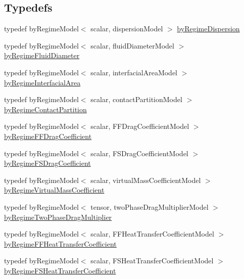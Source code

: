 \subsection*{Typedefs}
\begin{DoxyCompactItemize}
\item 
typedef by\+Regime\+Model$<$ scalar, dispersion\+Model $>$ \hyperlink{namespaceFoam_aca2583acdeaa11914afd02b147b665e0}{by\+Regime\+Dispersion}
\item 
typedef by\+Regime\+Model$<$ scalar, fluid\+Diameter\+Model $>$ \hyperlink{namespaceFoam_a37b69c3166b91333f06a5a6e7edcbcfe}{by\+Regime\+Fluid\+Diameter}
\item 
typedef by\+Regime\+Model$<$ scalar, interfacial\+Area\+Model $>$ \hyperlink{namespaceFoam_afdf68c0599c54515d78f0565678d1545}{by\+Regime\+Interfacial\+Area}
\item 
typedef by\+Regime\+Model$<$ scalar, contact\+Partition\+Model $>$ \hyperlink{namespaceFoam_a41017611e326f39a1a0e4469a6091014}{by\+Regime\+Contact\+Partition}
\item 
typedef by\+Regime\+Model$<$ scalar, F\+F\+Drag\+Coefficient\+Model $>$ \hyperlink{namespaceFoam_af81bf1c46b48683cfa1a97758c9a88ee}{by\+Regime\+F\+F\+Drag\+Coefficient}
\item 
typedef by\+Regime\+Model$<$ scalar, F\+S\+Drag\+Coefficient\+Model $>$ \hyperlink{namespaceFoam_a05904e7dc298f47d7b89ab3e56bcf421}{by\+Regime\+F\+S\+Drag\+Coefficient}
\item 
typedef by\+Regime\+Model$<$ scalar, virtual\+Mass\+Coefficient\+Model $>$ \hyperlink{namespaceFoam_a710fc9b4691ef70d9bc2552dcdd314f9}{by\+Regime\+Virtual\+Mass\+Coefficient}
\item 
typedef by\+Regime\+Model$<$ tensor, two\+Phase\+Drag\+Multiplier\+Model $>$ \hyperlink{namespaceFoam_a85c970e588825086eba5389c52020729}{by\+Regime\+Two\+Phase\+Drag\+Multiplier}
\item 
typedef by\+Regime\+Model$<$ scalar, F\+F\+Heat\+Transfer\+Coefficient\+Model $>$ \hyperlink{namespaceFoam_a931102c7c61e686c7aaecc790c34bfe5}{by\+Regime\+F\+F\+Heat\+Transfer\+Coefficient}
\item 
typedef by\+Regime\+Model$<$ scalar, F\+S\+Heat\+Transfer\+Coefficient\+Model $>$ \hyperlink{namespaceFoam_a58cd69873671ef15ae6cdbab25c15f74}{by\+Regime\+F\+S\+Heat\+Transfer\+Coefficient}
\end{DoxyCompactItemize}

